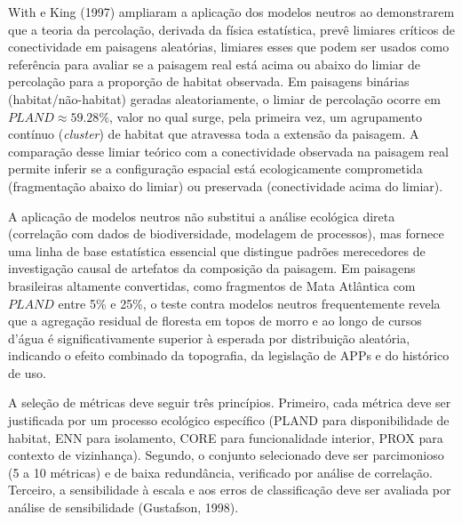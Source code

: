 \documentclass[
  portuguese,
  11pt,
  a4paper,
  open=any]{scrbook}
\begin{document}
With e King (1997) ampliaram a aplicação dos modelos neutros ao
demonstrarem que a teoria da percolação, derivada da física estatística,
prevê limiares críticos de conectividade em paisagens aleatórias,
limiares esses que podem ser usados como referência para avaliar se a
paisagem real está acima ou abaixo do limiar de percolação para a
proporção de habitat observada. Em paisagens binárias
(habitat/não-habitat) geradas aleatoriamente, o limiar de percolação
ocorre em \(PLAND \approx 59.28\%\), valor no qual surge, pela primeira
vez, um agrupamento contínuo (\emph{cluster}) de habitat que atravessa
toda a extensão da paisagem. A comparação desse limiar teórico com a
conectividade observada na paisagem real permite inferir se a
configuração espacial está ecologicamente comprometida (fragmentação
abaixo do limiar) ou preservada (conectividade acima do limiar).

A aplicação de modelos neutros não substitui a análise ecológica direta
(correlação com dados de biodiversidade, modelagem de processos), mas
fornece uma linha de base estatística essencial que distingue padrões
merecedores de investigação causal de artefatos da composição da
paisagem. Em paisagens brasileiras altamente convertidas, como
fragmentos de Mata Atlântica com \(PLAND\) entre 5\% e 25\%, o teste
contra modelos neutros frequentemente revela que a agregação residual de
floresta em topos de morro e ao longo de cursos d'água é
significativamente superior à esperada por distribuição aleatória,
indicando o efeito combinado da topografia, da legislação de APPs e do
histórico de uso.

\begin{tcolorbox}[enhanced jigsaw, colbacktitle=quarto-callout-tip-color!10!white, coltitle=black, opacityback=0, breakable, left=2mm, colback=white, bottomtitle=1mm, toptitle=1mm, titlerule=0mm, arc=.35mm, opacitybacktitle=0.6, leftrule=.75mm, colframe=quarto-callout-tip-color-frame, title=\textcolor{quarto-callout-tip-color}{\faLightbulb}\hspace{0.5em}{Boas práticas na seleção de métricas}, rightrule=.15mm, bottomrule=.15mm, toprule=.15mm]

A seleção de métricas deve seguir três princípios. Primeiro, cada
métrica deve ser justificada por um processo ecológico específico (PLAND
para disponibilidade de habitat, ENN para isolamento, CORE para
funcionalidade interior, PROX para contexto de vizinhança). Segundo, o
conjunto selecionado deve ser parcimonioso (5 a 10 métricas) e de baixa
redundância, verificado por análise de correlação. Terceiro, a
sensibilidade à escala e aos erros de classificação deve ser avaliada
por análise de sensibilidade (Gustafson, 1998).

\end{tcolorbox}
\end{document}
